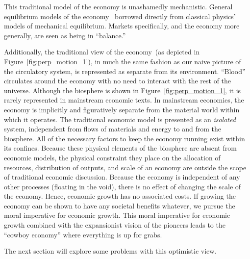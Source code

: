 This traditional model of the economy is unashamedly mechanistic.
General equilibrium models of the economy~\cite{Walras1892, Walras1993}
borrowed directly from classical physics' models of 
mechanical equilibrium.\cite{Ingrao1990}
Markets specifically,
and the economy more generally,
are seen as being in ``balance.''

Additionally,
the traditional view of the economy~(as
depicted in Figure~\ref{fig:perp_motion_1}),
in much the same fashion as our naive picture of
the circulatory system,
is represented as separate from its environment.
``Blood'' circulates around the economy
with no need to interact with the rest of the universe.
Although the biosphere is shown in
Figure~\ref{fig:perp_motion_1}, 
it is rarely represented in mainstream economic texts. 
In mainstream economics, 
the economy is implicitly and figuratively separate from 
the material world within which it operates.
The traditional economic model is presented as 
an \emph{isolated} system, 
independent from flows of materials and energy 
to and from the biosphere.
All of the necessary factors to keep the economy
running exist within its confines.
Because these physical elements of the biosphere are absent from economic models,
the physical constraint they place on the allocation of resources, distribution of outputs, and 
scale of an economy are outside the scope of traditional economic discussion.
Because the economy is independent of any other processes
(floating in the void),
there is no effect of changing the scale of the economy.
Hence, economic growth has no associated costs.
If growing the economy can be shown to have any
societal benefits whatever,
we pursue the moral imperative for economic growth.
This moral imperative for economic growth 
combined with the expansionist vision of the pioneers
leads to the ``cowboy economy''
where everything is up for grabs.\cite{Boulding1966}

The next section will explore some problems with this
optimistic view.



